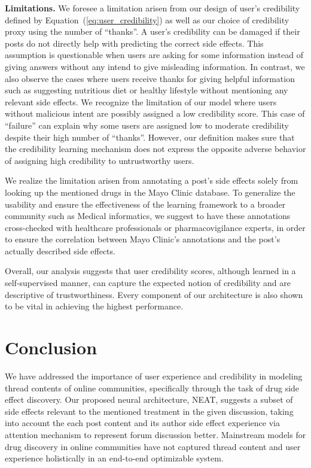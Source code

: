 \documentclass{bmcart}
\begin{document}
{\bf Limitations.} We foresee a limitation arisen from our design of user's credibility defined by Equation~(\ref{eq:user_credibility}) as well as our choice of credibility proxy using the number of ``thanks''. A user's credibility can be damaged if their posts do not directly help with predicting the correct side effects. 
This assumption is questionable when users are asking for some information instead of giving answers without any intend to give misleading information. 
In contrast, we also observe the cases where users receive thanks for giving helpful information such as suggesting nutritious diet or healthy lifestyle without mentioning any relevant side effects. We recognize the limitation of our model where users without malicious intent are possibly assigned a low credibility score. This case of ``failure'' can explain why some users are assigned low to moderate credibility despite their high number of ``thanks''. However, our definition makes sure that the credibility learning mechanism does not express the opposite adverse behavior of assigning high credibility to untrustworthy users.

We realize the limitation arisen from annotating a post's side effects solely from looking up the mentioned drugs in the Mayo Clinic database. To generalize the usability and ensure the effectiveness of the learning framework to a broader community such as Medical informatics, we suggest to have these annotations cross-checked with healthcare professionals or pharmacovigilance experts, in order to ensure the correlation between Mayo Clinic's annotations and the post's actually described side effects.

Overall, our analysis suggests that user credibility scores, although learned in a self-supervised manner, can capture the expected notion of credibility and are descriptive of trustworthiness. Every component of our architecture is also shown to be vital in achieving the highest performance.

\section{Conclusion}\label{sec:conclusion}
We have addressed the importance of user experience and credibility in
modeling thread contents of online communities, specifically through
the task of drug side effect discovery. 
Our proposed neural architecture, NEAT, suggests a subset of side effects relevant to 
the mentioned treatment in the given discussion, 
taking into account the each post content and its
author side effect experience via attention mechanism to represent forum discussion better. Mainstream models for drug discovery in online communities have not captured thread content and user experience holistically in an end-to-end optimizable system.
\end{document}
